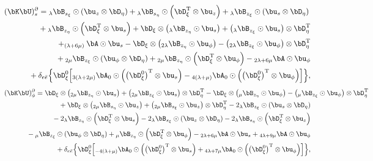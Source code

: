 \begin{eqnarray}
\lefteqn{
(\bK\bU)_s^{\partial}=
{{}_\lambda\bB}_{s_\xi} \odot \left(\bu_z\otimes\bD_{\eta}\right)+
{{}_\lambda\bB}_{s_\eta} \odot \left(\bD_\xi^{\rm{T}}\otimes{\bu_z}\right)+
{{}_\lambda\bB}_{z_\xi} \odot 
\left(\bu_s{}\otimes\bD_{\eta}\right)}
\nonumber\\&&\mbox{}\hspace{2.2em}
+{{}_\lambda\bB}_{z_\eta} \odot \left(\bD_\xi^{\rm{T}}\otimes{\bu_s}\right)
+ \bD_{\xi}\otimes\left({{}_\lambda\bB}_{z_\eta} \odot {\bu_s}\right)
+\left({{}_\lambda\bB}_{z_\xi} \odot {\bu_s}\right)\otimes\bD_{\eta}^{\rm{T}}
\nonumber\\&&\mbox{}\hspace{2.2em}
+ _{(\lambda+6\mu)}\bA\odot\bu_s 
-\bD_\xi\otimes\left({}_{2\lambda}\bB_{z_\eta}\odot{\bu_\phi}\right)
- \left({}_{2\lambda}\bB_{z_\xi}\odot{\bu_\phi}\right)\otimes\bD^{\rm{T}}_\eta 
 \nonumber\\&&\mbox{}\hspace{2.2em} 
+{}_{2\mu}\bB_{z_\xi}\odot\left(\bu_\phi\otimes\bD_\eta\right)
+{}_{2\mu}\bB_{z_\eta}\odot\left(\bD^{\rm{T}}_\xi\otimes \bu_\phi\right)
 - {}_{2\lambda+6\mu}\bA\odot \bu_\phi
 \nonumber\\&&\mbox{}\hspace{2.2em}  
+ \delta_{e\bar{e}}\Bigl\{
\bD^0_\xi\Bigl[{}_{3(\lambda+2\mu)}{\bA_0}\odot
\left(\left(\bD^0_\xi\right)^{\rm{T}}\otimes \bu_s\right)
-{}_{4(\lambda+\mu)}{\bA_0}
\odot\left(\left(\bD^0_\xi\right)^{\rm{T}} \otimes \bu_\phi\right)\Bigr]
\Bigr\},
\end{eqnarray}
%
\begin{eqnarray}
\lefteqn{(\bK\bU)_\phi^{\partial} =
\bD_\xi\otimes\left({}_{2\mu}\bB_{z_\eta}\odot{\bu_s}\right)+
\left({}_{2\mu}\bB_{z_\xi}\odot{\bu_s}\right)\otimes\bD^{\rm{T}}_\eta-
\bD_\xi\otimes\left({}_{\mu}\bB_{z_\eta}\odot{\bu_\phi}\right)-
\left({}_{\mu}\bB_{z_\xi}\odot{\bu_\phi}\right)\otimes\bD^{\rm{T}}_\eta 
}\nonumber\\&&\mbox{}\hspace{2.2em}
+\bD_\xi\otimes\left(_{2\mu}\bB_{s_\eta}\odot{\bu_z}\right)
+\left({}_{2\mu}\bB_{s_\xi}\odot{\bu_z}\right)\otimes\bD^{\rm{T}}_\eta-
2{}_\lambda\bB_{z_\xi}\odot\left(\bu_s\otimes\bD_\eta\right)
\nonumber\\&&\mbox{}\hspace{2.2em} 
-2{}_\lambda\bB_{z_\eta}\odot\left(\bD^{\rm{T}}_\xi\otimes \bu_s\right) 
-2{}_\lambda\bB_{s_\xi}\odot\left(\bu_z\otimes\bD_\eta\right)
- 2{}_\lambda\bB_{s_\eta}\odot\left(\bD^{\rm{T}}_\xi\otimes \bu_z\right)
\nonumber\\&&\mbox{}\hspace{2.2em} 
-{}_{\mu}\bB_{z_\xi}\odot\left(\bu_\phi\otimes\bD_\eta\right)
+{}_{\mu}\bB_{z_\eta}\odot\left(\bD^{\rm{T}}_\xi\otimes \bu_\phi\right) 
-{}_{2\lambda+6\mu}\bA\odot \bu_s 
+ {}_{4\lambda+9\mu}\bA\odot \bu_\phi 
\nonumber\\&&\mbox{}\hspace{2.2em}
+\delta_{e\bar{e}}\Bigl\{\bD^0_\xi\Bigl[
{}_{-4(\lambda+\mu)}{\bA_0}
\odot\left(\left(\bD^0_\xi\right)^{\rm{T}} \otimes \bu_s\right)
+{}_{4\lambda+7\mu}{\bA_0}
\odot\left(\left(\bD^0_\xi\right)^{\rm{T}} \otimes \bu_\phi\right)\Bigr]
\Bigr\},
\end{eqnarray}

